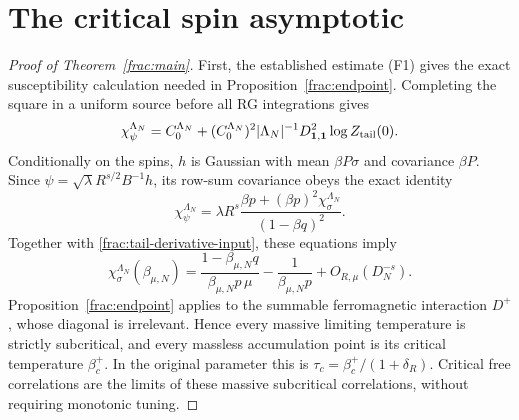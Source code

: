 \documentclass[11pt]{article}
\begin{document}
\section{The critical spin asymptotic}
\label{frac:reduction}
\begin{proof}[Proof of Theorem~\ref{frac:main}]
First, the established estimate (F1) gives the exact susceptibility calculation needed in
Proposition~\ref{frac:endpoint}. Completing the square in a uniform
source before all RG integrations gives
\[
 \chi_\psi^{\Lambda_N}
 =C_0^{\Lambda_N}+(C_0^{\Lambda_N})^2|\Lambda_N|^{-1}
 D^2_{\boldsymbol1,\boldsymbol1}\log Z_{\rm tail}(0).
\]
Conditionally on the spins, \(h\) is Gaussian with mean \(\beta P\sigma\)
and covariance \(\beta P\). Since \(\psi=\sqrt\lambda R^{s/2}B^{-1}h\),
its row-sum covariance obeys the exact identity
\[
 \chi_\psi^{\Lambda_N}
 =\lambda R^s\frac{\beta p+(\beta p)^2\chi_\sigma^{\Lambda_N}}
                         {(1-\beta q)^2}.
\]
Together with \eqref{frac:tail-derivative-input}, these equations imply
\begin{equation}\label{frac:suscept-identity}
 \chi_\sigma^{\Lambda_N}(\beta_{\mu,N})
   =\frac{1-\beta_{\mu,N}q}{\beta_{\mu,N}p\,\mu}
       -\frac1{\beta_{\mu,N}p}+O_{R,\mu}(D_N^{-s}).
\end{equation}
Proposition~\ref{frac:endpoint} applies to the summable ferromagnetic
interaction \(D^+\), whose diagonal is irrelevant. Hence every massive
limiting temperature is strictly subcritical, and every massless
accumulation point is its critical temperature \(\beta_c^+\). In the
original parameter this is \(\tau_c=\beta_c^+/(1+\delta_R)\).
Critical free correlations are the limits of these massive
subcritical correlations, without requiring monotonic tuning.


\end{proof}
\end{document}
